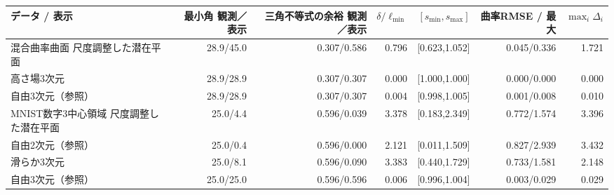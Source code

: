 \begin{tabular}{lrrrrrr}
\toprule
データ / 表示 & 最小角 観測／表示 & 三角不等式の余裕 観測／表示 & $\delta/\ell_{\min}$ & $[s_{\min},s_{\max}]$ & 曲率RMSE / 最大 & $\max_i\Delta_i$ \\
\midrule
混合曲率曲面 尺度調整した潜在平面 & 28.9/45.0 & 0.307/0.586 & 0.796 & [0.623,1.052] & 0.045/0.336 & 1.721 \\
 高さ場3次元 & 28.9/28.9 & 0.307/0.307 & 0.000 & [1.000,1.000] & 0.000/0.000 & 0.000 \\
 自由3次元（参照） & 28.9/28.9 & 0.307/0.307 & 0.004 & [0.998,1.005] & 0.001/0.008 & 0.010 \\
\addlinespace
MNIST数字3中心領域 尺度調整した潜在平面 & 25.0/4.4 & 0.596/0.039 & 3.378 & [0.183,2.349] & 0.772/1.574 & 3.396 \\
 自由2次元（参照） & 25.0/0.4 & 0.596/0.000 & 2.121 & [0.011,1.509] & 0.827/2.939 & 3.432 \\
 滑らか3次元 & 25.0/8.1 & 0.596/0.090 & 3.383 & [0.440,1.729] & 0.733/1.581 & 2.148 \\
 自由3次元（参照） & 25.0/25.0 & 0.596/0.596 & 0.006 & [0.996,1.004] & 0.003/0.029 & 0.029 \\
\bottomrule
\end{tabular}
